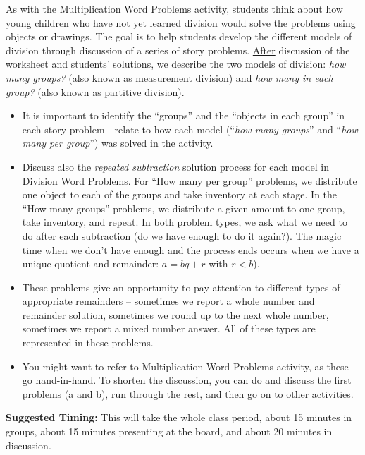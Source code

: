 \documentclass{ximera}
\begin{document}
\newpage

\begin{instructorNotes}
As with the Multiplication Word Problems activity, students think about how young children who have not yet learned division would solve the problems using objects or drawings.  The goal is to help students develop the different models of division through discussion of a series of story problems.  \underline{After} discussion of the worksheet and students' solutions, we describe the two models of division: {\em how many groups?} (also known as measurement division) and {\em how many in each group? } (also known as partitive division).

\begin{itemize}
	\item It is important to identify the ``groups'' and the ``objects in each group'' in each story problem - relate to how each model (``{\em how many groups}'' and ``{\em how many per group}'') was solved in the activity.
	\item Discuss also the {\em repeated subtraction} solution process for each model in Division Word Problems.  For ``How many per group'' problems, we distribute one object to each of the groups and take inventory at each stage.  In the ``How many groups'' problems, we distribute a given amount to one group, take inventory, and repeat.  In both problem types, we ask what we need to do after each subtraction (do we have enough to do it again?). The magic time when we don't have enough and the process ends occurs when we have a unique quotient and remainder:  $a = bq + r$ with $r < b$).  
	\item These problems give an opportunity to pay attention to different types of appropriate remainders -- sometimes we report a whole number and remainder solution, sometimes we round up to the next whole number, sometimes we report a mixed number answer.  All of these types are represented in these problems. 
    \item You might want to refer to Multiplication Word Problems activity, as these go hand-in-hand.  To shorten the discussion, you can do and discuss the first problems (a and b), run through the rest, and then go on to other activities.
\end{itemize}



{\bf Suggested Timing:} This will take the whole class period, about 15 minutes in groups, about 15 minutes presenting at the board, and about 20 minutes in discussion.
\end{instructorNotes}
\end{document}
